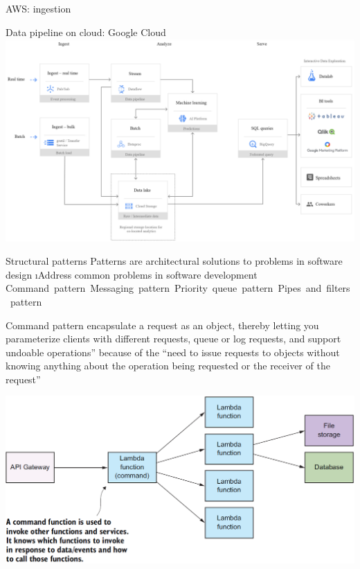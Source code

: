 {
\begin{frame}{AWS: ingestion}
    
\end{frame}
}

\begin{frame}{Data pipeline on cloud: Google Cloud}
\includegraphics[height=.8\textheight]{imgs/gcpipeline.png}
\end{frame}



\begin{frame}{Structural patterns}
Patterns are architectural solutions to problems in software design
\i Address common problems in software development
\si Command pattern
\si Messaging pattern
\si Priority queue pattern
\si Pipes and filters pattern
\end{frame}

\begin{frame}{Command pattern}
encapsulate a request as an object, thereby letting you parameterize clients with different requests, queue or log requests, and support undoable operations” because of the “need to issue requests to objects without knowing anything about the operation being requested or the receiver of the request”

\includegraphics[scale=.4]{imgs/pattern_command.PNG}
\end{frame}

